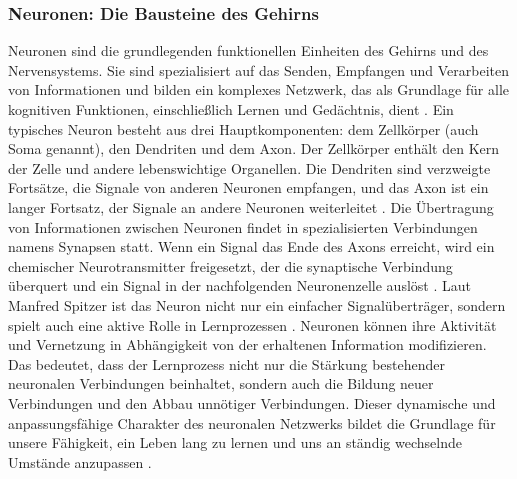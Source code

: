 \subsubsection{Neuronen: Die Bausteine des Gehirns}
Neuronen sind die grundlegenden funktionellen Einheiten des Gehirns und des Nervensystems. Sie sind spezialisiert auf das Senden, Empfangen und Verarbeiten von Informationen und bilden ein komplexes Netzwerk, das als Grundlage für alle kognitiven Funktionen, einschließlich Lernen und Gedächtnis, dient \cite{Bear2015}. \newline
Ein typisches Neuron besteht aus drei Hauptkomponenten: dem Zellkörper (auch Soma genannt), den Dendriten und dem Axon. Der Zellkörper enthält den Kern der Zelle und andere lebenswichtige Organellen. Die Dendriten sind verzweigte Fortsätze, die Signale von anderen Neuronen empfangen, und das Axon ist ein langer Fortsatz, der Signale an andere Neuronen weiterleitet \cite{Kandel2012}. \newline
Die Übertragung von Informationen zwischen Neuronen findet in spezialisierten Verbindungen namens Synapsen statt. Wenn ein Signal das Ende des Axons erreicht, wird ein chemischer Neurotransmitter freigesetzt, der die synaptische Verbindung überquert und ein Signal in der nachfolgenden Neuronenzelle auslöst \cite{Bear2015}. \newline
Laut Manfred Spitzer ist das Neuron nicht nur ein einfacher Signalüberträger, sondern spielt auch eine aktive Rolle in Lernprozessen \cite{Spitzer2002}. Neuronen können ihre Aktivität und Vernetzung in Abhängigkeit von der erhaltenen Information modifizieren. Das bedeutet, dass der Lernprozess nicht nur die Stärkung bestehender neuronalen Verbindungen beinhaltet, sondern auch die Bildung neuer Verbindungen und den Abbau unnötiger Verbindungen. Dieser dynamische und anpassungsfähige Charakter des neuronalen Netzwerks bildet die Grundlage für unsere Fähigkeit, ein Leben lang zu lernen und uns an ständig wechselnde Umstände anzupassen \cite{Spitzer2002}. \newline
